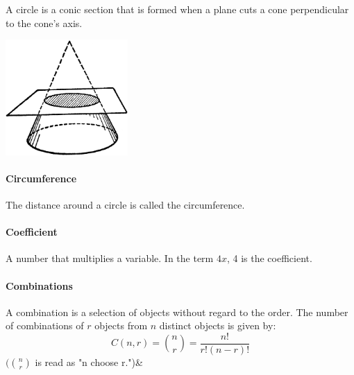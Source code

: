 \documentclass[12pt]{article}
\begin{document}
A circle is a conic section that is formed when a plane cuts a cone perpendicular to the cone's axis.

\begin{center}
\includegraphics[width=0.35\textwidth]{conic_crcle.jpg}
\end{center}

\paragraph{Circumference}
The distance around a circle is called the circumference.

\begin{center}
\end{center}

\paragraph{Coefficient}
A number that multiplies a variable. In the term \( 4x \), 4 is the coefficient.

\paragraph{Combinations}
A combination is a selection of objects without regard to the order. The number of combinations of \( r \) objects from \( n \) distinct objects is given by:
\[C(n, r) = \binom{n}{r} = \frac{n!}{r!(n-r)!}\]
$(\binom{n}{r}$\textrm{ is read as "n choose r.")}&
\end{document}

